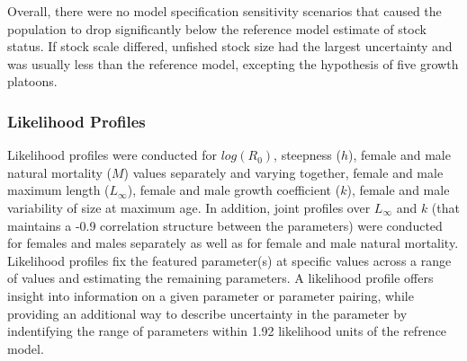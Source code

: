 \documentclass[11pt,
  english,
  a4paper,
]{article}
\begin{document}
Overall, there were no model specification sensitivity scenarios that caused the population to drop significantly below the reference model estimate of stock status. If stock scale differed, unfished stock size had the largest uncertainty and was usually less than the reference model, excepting the hypothesis of five growth platoons.

\leavevmode\tagmcend\tagstructend\par


\hypertarget{likelihood-profiles}{%
\subsubsection{Likelihood Profiles}\label{likelihood-profiles}}

\leavevmode\tagmcend\tagstructend


Likelihood profiles were conducted for {\(log(R_0)\)\leavevmode\tagmcend\tagstructend}, steepness ({\(h\)\leavevmode\tagmcend\tagstructend}), female and male natural mortality ({\(M\)\leavevmode\tagmcend\tagstructend}) values separately and varying together, female and male maximum length ({\(L_{\infty}\)\leavevmode\tagmcend\tagstructend}), female and male growth coefficient ({\(k\)\leavevmode\tagmcend\tagstructend}), female and male variability of size at maximum age. In addition, joint profiles over {\(L_{\infty}\)\leavevmode\tagmcend\tagstructend} and {\(k\)\leavevmode\tagmcend\tagstructend} (that maintains a -0.9 correlation structure between the parameters) were conducted for females and males separately as well as for female and male natural mortality. Likelihood profiles fix the featured parameter(s) at specific values across a range of values and estimating the remaining parameters. A likelihood profile offers insight into information on a given parameter or parameter pairing, while providing an additional way to describe uncertainty in the parameter by indentifying the range of parameters within 1.92 likelihood units of the refrence model.
\end{document}
